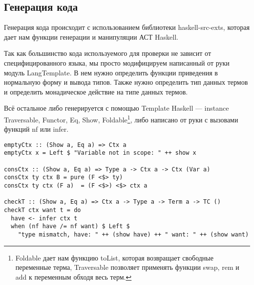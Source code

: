 \subsection{Генерация кода}
Генерация кода происходит с использованием библиотеки haskell-src-exts\cite{src_exts}, которая дает нам функции генерации и манипуляции АСТ Haskell.

Так как большинство кода используемого для проверки не зависит от специфицированного языка, мы просто модифицируем написанный от руки модуль LangTemplate. В нем нужно определить функции приведения в нормальную форму и вывода типов. Также нужно определить тип данных термов и определить монадическое действие на типе данных термов.

Всё остальное либо генерируется с помощью Template Haskell\cite{TH} --- instance Traversable, Functor, Eq, Show, Foldable\footnote{Foldable дает нам функцию toList, которая возвращает свободные переменные терма, Traversable позволяет применять функции swap, rem и add  к переменным обходя весь терм.}, либо написано от руки с вызовами функций nf или infer.

\begin{lstlisting}[caption={Проверка типов и контексты},captionpos=b, frame=single]
emptyCtx :: (Show a, Eq a) => Ctx a
emptyCtx x = Left $ "Variable not in scope: " ++ show x

consCtx :: (Show a, Eq a) => Type a -> Ctx a -> Ctx (Var a)
consCtx ty ctx B = pure (F <$> ty)
consCtx ty ctx (F a)  = (F <$>) <$> ctx a

checkT :: (Show a, Eq a) => Ctx a -> Type a -> Term a -> TC ()
checkT ctx want t = do
  have <- infer ctx t
  when (nf have /= nf want) $ Left $
    "type mismatch, have: " ++ (show have) ++ " want: " ++ (show want)
\end{lstlisting}



